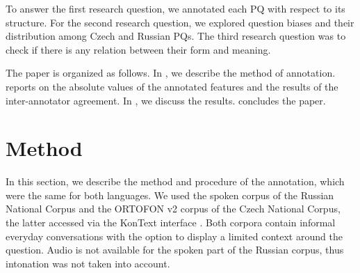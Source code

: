\documentclass[output=paper,colorlinks,citecolor=brown]{langscibook}
\begin{document}
To answer the first research question, we annotated each PQ with respect to its structure. For the second research question, we explored question biases \citep{Buering2000, Sudo2013, Gaertner2017} and their distribution among Czech and Russian PQs. The third research question was to check if there is any relation between their form and meaning.

The paper is organized as follows. In , we describe the method of annotation.  reports on the absolute values of the annotated features and the results of the inter-annotator agreement. In , we discuss the results.  concludes the paper. 

\section{Method} \label{section-method}

In this section, we describe the method and procedure of the annotation, which were the same for both languages. We used the spoken corpus of the Russian National Corpus \citep{Grisina2005, Grisina2009} and the ORTOFON v2 corpus \citep{ortofon_v2} of the Czech National Corpus, the latter accessed via the KonText interface \citep{kontext_interface}. Both corpora contain informal everyday conversations with the option to display a limited context around the question. Audio is not available for the spoken part of the Russian corpus, thus intonation was not taken into account. 
\end{document}
